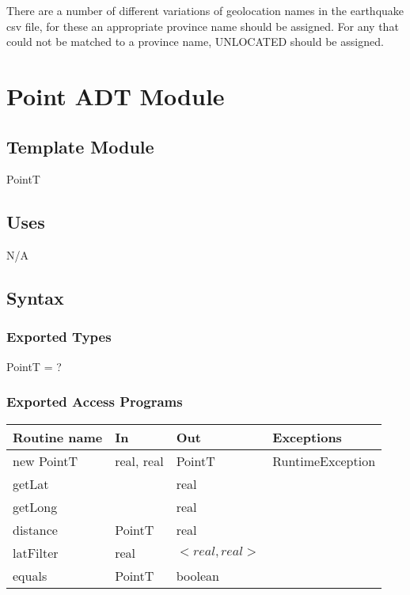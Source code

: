 \documentclass[12pt]{article}
\begin{document}
There are a number of different variations of geolocation names in the earthquake csv file, for these an appropriate province name
should be assigned. For any that could not be matched to a province name, UNLOCATED should be assigned.\\



\newpage

\section* {Point ADT Module}

\subsection* {Template Module}

PointT

\subsection* {Uses}

N/A

\subsection* {Syntax}

\subsubsection* {Exported Types}

PointT = ?


\subsubsection* {Exported Access Programs}

\begin{tabular}{| l | l | l | p{6cm} |}
\hline
\textbf{Routine name} & \textbf{In} & \textbf{Out} & \textbf{Exceptions}\\
\hline
new PointT & real, real & PointT & RuntimeException\\
\hline
getLat & ~ & real & \\
\hline
getLong &~ & real & \\
\hline
distance & PointT & real & \\
\hline
latFilter & real & $<real, real>$ & \\
\hline
equals & PointT & boolean & \\
\hline

\end{tabular}
\end{document}
